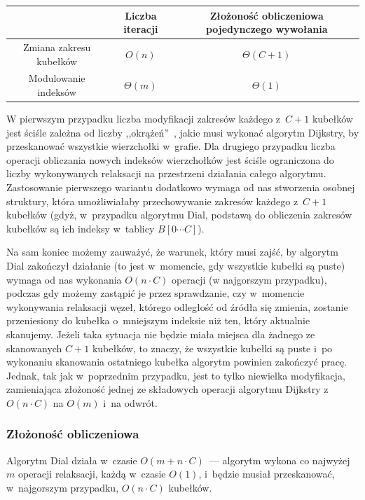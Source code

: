 \begin{center}
	\begin{tabular}{ccc}
		& Liczba iteracji & Złożoność obliczeniowa pojedynczego wywołania \\
		\hline
		Zmiana zakresu kubełków & $ O \left( n \right) $ & $ \Theta \left( C + 1 \right) $ \\
		Modulowanie indeksów & $ \Theta \left( m \right) $ & $ \Theta \left( 1 \right) $ \\
		\hline
	\end{tabular}
\end{center}

W pierwszym przypadku liczba modyfikacji zakresów każdego z~$C+1$ kubełków jest ściśle zależna od liczby ,,okrążeń''~, jakie musi wykonać algorytm Dijkstry, by przeskanować wszystkie wierzchołki w~grafie. Dla drugiego przypadku liczba operacji obliczania nowych indeksów wierzchołków jest ściśle ograniczona do liczby wykonywanych relaksacji na przestrzeni działania całego algorytmu. Zastosowanie pierwszego wariantu dodatkowo wymaga od nas stworzenia osobnej struktury, która umożliwiałaby przechowywanie zakresów każdego z~$C+1$ kubełków (gdyż, w~przypadku algorytmu Dial, podstawą do obliczenia zakresów kubełków są ich indeksy w~tablicy $ B \left[ 0 \cdots C \right]$).

Na sam koniec możemy zauważyć, że warunek, który musi zajść, by algorytm Dial zakończył działanie (to jest w~momencie, gdy wszystkie kubełki są puste) wymaga od nas wykonania $ O \left( n \cdot C \right)$ operacji (w najgorszym przypadku), podczas gdy możemy zastąpić je przez sprawdzanie, czy w~momencie wykonywania relaksacji węzeł, którego odległość od źródła się zmienia, zostanie przeniesiony do kubełka o~mniejszym indeksie niż ten, który aktualnie skanujemy. Jeżeli taka sytuacja nie będzie miała miejsca dla żadnego ze skanowanych $C+1$ kubełków, to znaczy, że wszystkie kubełki są puste i~po wykonaniu skanowania ostatniego kubełka algorytm powinien zakończyć pracę. Jednak, tak jak w~poprzednim przypadku, jest to tylko niewielka modyfikacja, zamieniająca złożoność jednej ze składowych operacji algorytmu Dijkstry z~$ O \left( n \cdot C \right)$ na $ O \left( m \right)$ i~na odwrót.

\subsubsection{Złożoność obliczeniowa}

Algorytm Dial działa w~czasie $O \left( m + n \cdot C \right)$~--- algorytm wykona co najwyżej $m$ operacji relaksacji, każdą w~czasie $O \left( 1 \right)$, i~będzie musiał przeskanować, w~najgorszym przypadku, $O \left( n \cdot C \right)$ kubełków.


